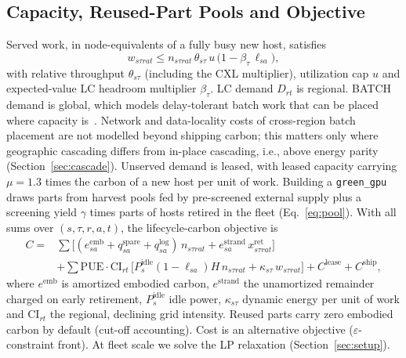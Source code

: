 \documentclass{article} %
\begin{document}
\subsection{Capacity, Reused-Part Pools and Objective}
\label{sec:method_cap}
\label{sec:method_obj}
Served work, in node-equivalents of a fully busy new host, satisfies
\begin{equation}
w_{s\tau r a t} \le n_{s\tau r a t}\,\theta_{s\tau}\, u \,\big(1 - \beta_\tau\, \ell_{s a}\big),
\label{eq:capacity}
\end{equation}
with relative throughput $\theta_{s\tau}$ (including the CXL multiplier), utilization cap $u$ and expected-value LC headroom multiplier $\beta_\tau$. LC demand $D_{rt}$ is regional. BATCH demand is global, which models delay-tolerant batch work that can be placed where capacity is~\citep{Wiesner2021LetsWait,Lechowicz2025LearningaugmentedCompetitive}. Network and data-locality costs of cross-region batch placement are not modelled beyond shipping carbon; this matters only where geographic cascading differs from in-place cascading, i.e., above energy parity (Section~\ref{sec:cascade}). Unserved demand is leased, with leased capacity carrying $\mu=1.3$ times the carbon of a new host per unit of work. Building a \texttt{green\_gpu} draws parts from harvest pools fed by pre-screened external supply plus a screening yield $\gamma$ times parts of hosts retired in the fleet (Eq.~\ref{eq:pool}). With all sums over $(s,\tau,r,a,t)$, the lifecycle-carbon objective is
\begin{equation}
\begin{split}
C = {} & \textstyle\sum \big[(e^{\text{emb}}_{s a} + q^{\text{spare}}_{sa} + q^{\text{log}}_{sa})\, n_{s\tau rat} + e^{\text{strand}}_{s a}\, x^{\text{ret}}_{s\tau rat}\big] \\
& + \textstyle\sum \text{PUE}\cdot\text{CI}_{r t}\,\big[P^{\text{idle}}_s (1-\ell_{sa}) H\, n_{s\tau rat} + \kappa_{s\tau}\, w_{s\tau rat}\big] + C^{\text{lease}} + C^{\text{ship}},
\end{split}
\label{eq:objective}
\end{equation}
where $e^{\text{emb}}$ is amortized embodied carbon, $e^{\text{strand}}$ the unamortized remainder charged on early retirement, $P^{\text{idle}}_s$ idle power, $\kappa_{s\tau}$ dynamic energy per unit of work and $\text{CI}_{rt}$ the regional, declining grid intensity. Reused parts carry zero embodied carbon by default (cut-off accounting). Cost is an alternative objective ($\varepsilon$-constraint front). At fleet scale we solve the LP relaxation (Section~\ref{sec:setup}).
\end{document}
